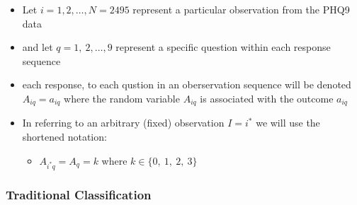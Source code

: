\documentclass[12pt,]{article}
\providecommand{\tightlist}{%
  \setlength{\itemsep}{0pt}\setlength{\parskip}{0pt}}
\begin{document}
\begin{itemize}
\tightlist
\item
  Let \(i=1, 2, \ldots, N=2495\) represent a particular observation from
  the PHQ9 data\\
\item
  and let \(q=1, \ 2, \ldots, 9\) represent a specific question within
  each response sequence\\
\item
  each response, to each qustion in an oberservation sequence will be
  denoted \(A_{iq}=a_{iq}\) where the random variable \(A_{iq}\) is
  associated with the outcome \(a_{iq}\)\\
\item
  In referring to an arbitrary (fixed) observation \(I=i^{*}\) we will
  use the shortened notation:

  \begin{itemize}
  \tightlist
  \item
    \(A_{i^{*}q}=A_{q}=k\) where \(k\in \{ 0,\ 1, \ 2, \ 3 \}\)
  \end{itemize}
\end{itemize}

\hypertarget{traditional-classification}{%
\subsubsection{Traditional
Classification}\label{traditional-classification}}
\end{document}

